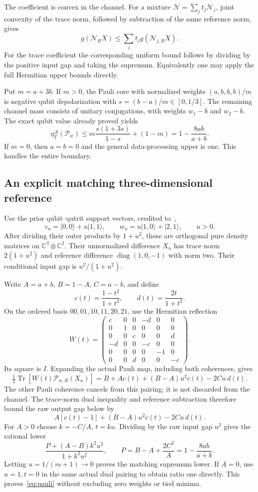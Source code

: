 \documentclass[11pt,a4paper]{article}
\newcommand{\Tr}{\operatorname{Tr}}
\newcommand{\cN}{\mathcal N}
\newcommand{\cP}{\mathcal P}
\newcommand{\ket}[1]{\lvert#1\rangle}
\newcommand{\etatr}{\eta^{\Delta}_T}
\begin{document}
The coefficient is convex in the channel. For a mixture $\cN=\sum_jt_j\cN_j$, joint convexity of the trace norm, followed by subtraction of the same reference norm, gives
\[
 g(\cN_RX)\le\sum_jt_jg(\cN_{j,R}X).
\]
For the trace coefficient the corresponding uniform bound follows by dividing by the positive input gap and taking the supremum. Equivalently one may apply the full Hermitian upper bounds directly.

Put $m=a+3b$. If $m>0$, the Pauli core with normalized weights $(a,b,b,b)/m$ is negative qubit depolarization with
$s=(b-a)/m\in[0,1/3]$. The remaining channel mass consists of unitary conjugations, with weights $w_1-b$ and $w_2-b$. The exact qubit value already proved yields
\[
 \etatr(\cP_w)\le m\frac{s(1+3s)}{1-s}+(1-m)
 =1-\frac{8ab}{a+b}.
\]
If $m=0$, then $a=b=0$ and the general data-processing upper is one. This handles the entire boundary.

\subsection{An explicit matching three-dimensional reference}
Use the prior qubit--qutrit support vectors, credited to~\cite{ErikssonUnital},
\[
 v_u=\ket{0,0}+u\ket{1,1},\qquad
 w_u=u\ket{1,0}+\ket{2,1},\qquad u>0.
\]
After dividing their outer products by $1+u^2$, these are orthogonal pure density matrices on $\mathbb C^3\otimes\mathbb C^2$. Their unnormalized difference $X_u$ has trace norm $2(1+u^2)$ and reference difference $\operatorname{diag}(1,0,-1)$ with norm two. Their conditional input gap is $u^2/(1+u^2)$.

Write $A=a+b$, $B=1-A$, $C=a-b$, and define
\[
 c(t)=\frac{1-t^2}{1+t^2},\qquad d(t)=\frac{2t}{1+t^2}.
\]
On the ordered basis $00,01,10,11,20,21$, use the Hermitian reflection
\[
 W(t)=\begin{pmatrix}
 c&0&0&-d&0&0\\
 0&1&0&0&0&0\\
 0&0&c&0&0&d\\
 -d&0&0&-c&0&0\\
 0&0&0&0&-1&0\\
 0&0&d&0&0&-c
 \end{pmatrix}.
\]
Its square is $I$. Expanding the actual Pauli map, including both coherences, gives
\[
 \tfrac12\Tr[W(t)\cP_{w,R}(X_u)]
 =B+A c(t)+(B-A)u^2c(t)-2Cu\,d(t).
\]
The other Pauli coherence cancels from this pairing; it is not discarded from the channel. The trace-norm dual inequality and reference subtraction therefore bound the raw output gap below by
\[
 A[c(t)-1]+(B-A)u^2c(t)-2Cu\,d(t).
\]
For $A>0$ choose $k=-C/A$, $t=ku$. Dividing by the raw input gap $u^2$ gives the rational lower
\[
 \frac{P+(A-B)k^2u^2}{1+k^2u^2},\qquad
 P=B-A+\frac{2C^2}{A}=1-\frac{8ab}{a+b}.
\]
Letting $u=1/(m+1)\to0$ proves the matching supremum lower. If $A=0$, use $u=1,t=0$ in the same actual dual pairing to obtain ratio one directly. This proves~\eqref{eq:pauli} without excluding zero weights or tied minima.
\end{document}
